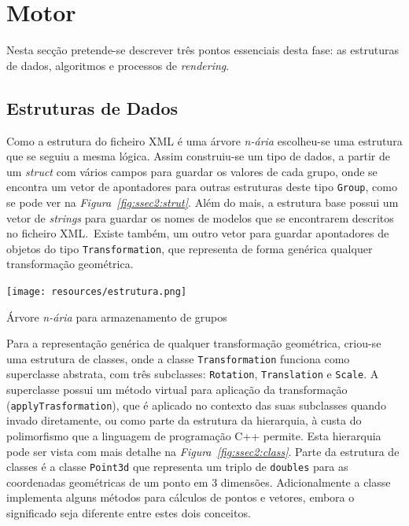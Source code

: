 \section{Motor}

Nesta secção pretende-se descrever três pontos essenciais desta fase: as
estruturas de dados, algoritmos e processos de \emph{rendering}.


\subsection{Estruturas de Dados}
\label{subsec:sec2}

Como a estrutura do ficheiro XML é uma árvore \emph{n-ária} escolheu-se uma
estrutura que se seguiu a mesma lógica. Assim construiu-se um tipo de dados,
a partir de um \emph{struct} com vários campos para guardar os valores de cada
grupo, onde se encontra um vetor de apontadores para outras estruturas deste
tipo \texttt{Group}, como se pode ver na \emph{Figura~\ref{fig:ssec2:strut}}.
Além do mais, a estrutura base possui um vetor de \emph{strings} para guardar
os nomes de modelos que se encontrarem descritos no ficheiro XML.\ Existe também,
um outro vetor para guardar apontadores de objetos do tipo
\texttt{Transformation}, que representa de forma genérica qualquer transformação
geométrica.

\begin{center} 	
\texttt{[image: resources/estrutura.png]}
\captionsetup{type=figure, width=0.8\linewidth}
\caption{Árvore \emph{n-ária} para armazenamento de grupos}
\label{fig:ssec2:strut} 
\end{center}

Para a representação genérica de qualquer transformação geométrica, criou-se
uma estrutura de classes, onde a classe \texttt{Transformation} funciona como
superclasse abstrata, com três subclasses: \texttt{Rotation},
\texttt{Translation} e \texttt{Scale}. A superclasse possui um método virtual
para aplicação da transformação (\texttt{applyTrasformation}), que é aplicado no
contexto das suas subclasses quando invado diretamente, ou como parte da
estrutura da hierarquia, à custa do polimorfismo que a linguagem de programação
C++ permite. Esta hierarquia pode ser vista com mais detalhe na
\emph{Figura~\ref{fig:ssec2:class}}. Parte da estrutura de classes é a classe
\texttt{Point3d} que representa um triplo de \texttt{doubles} para as
coordenadas geométricas de um ponto em 3 dimensões. Adicionalmente a classe
implementa alguns métodos para cálculos de pontos e vetores, embora
o significado seja diferente entre estes dois conceitos.


